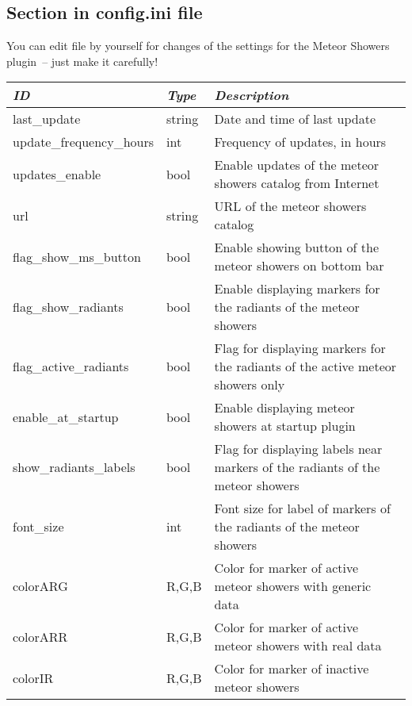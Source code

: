 \subsection{Section  in config.ini file}

You can edit  file by yourself for changes of the
settings for the Meteor Showers plugin~-- just make it carefully!

\noindent%
\begin{tabularx}{\textwidth}{l|l|X}\toprule
\emph{ID}            & \emph{Type} & \emph{Description}\\\midrule
last\_update          & string & Date and time of last update \\%
update\_frequency\_hours & int & Frequency of updates, in hours \\%
updates\_enable         & bool & Enable updates of the meteor showers catalog from Internet \\%
url                   & string & URL of the meteor showers catalog \\%
flag\_show\_ms\_button  & bool & Enable showing button of the meteor showers on bottom bar \\%
flag\_show\_radiants    & bool & Enable displaying markers for the radiants of the meteor showers \\%
flag\_active\_radiants  & bool & Flag for displaying markers for the radiants of the active meteor showers only \\%
enable\_at\_startup     & bool & Enable displaying meteor showers at startup plugin \\%
show\_radiants\_labels  & bool & Flag for displaying labels near markers of the radiants of the meteor showers \\%
font\_size              & int  & Font size for label of markers of the radiants of the meteor showers \\%
colorARG               & R,G,B & Color for marker of active meteor showers with generic data \\%
colorARR               & R,G,B & Color for marker of active meteor showers with real data \\%
colorIR                & R,G,B & Color for marker of inactive meteor showers \\\bottomrule
\end{tabularx}


